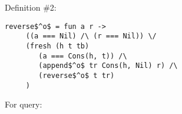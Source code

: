 \begin{enumerate}
\begin{minipage}{\linewidth}
\end{minipage}
 
\begin{minipage}{\linewidth}
Definition \#2:

\begin{lstlisting}[basicstyle=\small]
   reverse$^o$ = fun a r ->
     ((a === Nil) /\ (r === Nil)) \/
     (fresh (h t tb)
        (a === Cons(h, t)) /\
        (append$^o$ tr Cons(h, Nil) r) /\
        (reverse$^o$ t tr)
     )
\end{lstlisting}
\end{minipage}

\begin{minipage}{\linewidth}
For query:

\end{minipage}

\end{enumerate} 